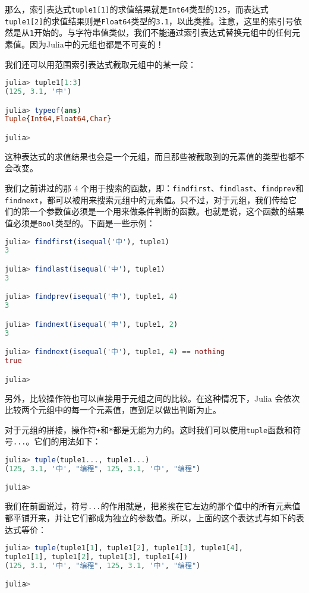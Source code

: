 那么，索引表达式\verb|tuple1[1]|的求值结果就是\verb|Int64|类型的\verb|125|，而表达式\verb|tuple1[2]|的求值结果则是\verb|Float64|类型的\verb|3.1|，以此类推。注意，这里的索引号依然是从\verb|1|开始的。与字符串值类似，我们不能通过索引表达式替换元组中的任何元素值。因为Julia中的元组也都是不可变的！

我们还可以用范围索引表达式截取元组中的某一段：
\begin{lstlisting}[language=julia]
julia> tuple1[1:3]
(125, 3.1, '中')

julia> typeof(ans)
Tuple{Int64,Float64,Char}

julia> 
\end{lstlisting}

这种表达式的求值结果也会是一个元组，而且那些被截取到的元素值的类型也都不会改变。

我们之前讲过的那 4 个用于搜索的函数，即：\verb|findfirst|、\verb|findlast|、\verb|findprev|和\verb|findnext|，都可以被用来搜索元组中的元素值。只不过，对于元组，我们传给它们的第一个参数值必须是一个用来做条件判断的函数。也就是说，这个函数的结果值必须是\verb|Bool|类型的。下面是一些示例：
\begin{lstlisting}[language=julia]
julia> findfirst(isequal('中'), tuple1)
3

julia> findlast(isequal('中'), tuple1)
3

julia> findprev(isequal('中'), tuple1, 4)
3

julia> findnext(isequal('中'), tuple1, 2)
3

julia> findnext(isequal('中'), tuple1, 4) == nothing
true

julia>  
\end{lstlisting}

另外，比较操作符也可以直接用于元组之间的比较。在这种情况下，Julia 会依次比较两个元组中的每一个元素值，直到足以做出判断为止。

对于元组的拼接，操作符\verb|+|和\verb|*|都是无能为力的。这时我们可以使用\verb|tuple|函数和符号\verb|...|。它们的用法如下：
\begin{lstlisting}[language=julia]
julia> tuple(tuple1..., tuple1...)
(125, 3.1, '中', "编程", 125, 3.1, '中', "编程")

julia> 
\end{lstlisting}

我们在前面说过，符号\verb|...|的作用就是，把紧挨在它左边的那个值中的所有元素值都平铺开来，并让它们都成为独立的参数值。所以，上面的这个表达式与如下的表达式等价：
\begin{lstlisting}[language=julia]
julia> tuple(tuple1[1], tuple1[2], tuple1[3], tuple1[4], 
tuple1[1], tuple1[2], tuple1[3], tuple1[4])
(125, 3.1, '中', "编程", 125, 3.1, '中', "编程")

julia> 
\end{lstlisting}

